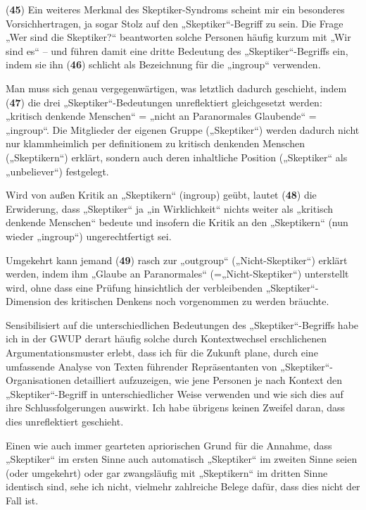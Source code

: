 (\textbf{45}) Ein weiteres Merkmal des Skeptiker-Syndroms scheint mir
ein besonderes Vorsichhertragen, ja sogar Stolz auf den
„Skeptiker``-Begriff zu sein. Die Frage „Wer sind die Skeptiker?``
beantworten solche Personen häufig kurzum mit „Wir sind es`` -- und
führen damit eine dritte Bedeutung des „Skeptiker``-Begriffs ein, indem
sie ihn (\textbf{46}) schlicht als Bezeichnung für die „ingroup``
verwenden.

Man muss sich genau vergegenwärtigen, was letztlich dadurch geschieht,
indem (\textbf{47}) die drei „Skeptiker``-Bedeutungen unreflektiert
gleichgesetzt werden: „kritisch denkende Menschen`` = „nicht an
Paranormales Glaubende`` = „ingroup``. Die Mitglieder der eigenen Gruppe
(„Skeptiker``) werden dadurch nicht nur klammheimlich per definitionem
zu kritisch denkenden Menschen („Skeptikern``) erklärt, sondern auch
deren inhaltliche Position („Skeptiker`` als „unbeliever``) festgelegt.

Wird von außen Kritik an „Skeptikern`` (ingroup) geübt, lautet
(\textbf{48}) die Erwiderung, dass „Skeptiker`` ja „in Wirklichkeit``
nichts weiter als „kritisch denkende Menschen`` bedeute und insofern die
Kritik an den „Skeptikern`` (nun wieder „ingroup``) ungerechtfertigt
sei.

Umgekehrt kann jemand (\textbf{49}) rasch zur „outgroup``
(„Nicht-Skeptiker``) erklärt werden, indem ihm „Glaube an Paranormales``
(=„Nicht-Skeptiker``) unterstellt wird, ohne dass eine Prüfung
hinsichtlich der verbleibenden „Skeptiker``-Dimension des kritischen
Denkens noch vorgenommen zu werden bräuchte.

Sensibilisiert auf die unterschiedlichen Bedeutungen des
„Skeptiker``-Begriffs habe ich in der GWUP derart häufig solche durch
Kontextwechsel erschlichenen Argumentationsmuster erlebt, dass ich für
die Zukunft plane, durch eine umfassende Analyse von Texten führender
Repräsentanten von „Skeptiker``-Organisationen detailliert aufzuzeigen,
wie jene Personen je nach Kontext den „Skeptiker``-Begriff in
unterschiedlicher Weise verwenden und wie sich dies auf ihre
Schlussfolgerungen auswirkt. Ich habe übrigens keinen Zweifel daran,
dass dies unreflektiert geschieht.

Einen wie auch immer gearteten apriorischen Grund für die Annahme, dass
„Skeptiker`` im ersten Sinne auch automatisch „Skeptiker`` im zweiten
Sinne seien (oder umgekehrt) oder gar zwangsläufig mit „Skeptikern`` im
dritten Sinne identisch sind, sehe ich nicht, vielmehr zahlreiche Belege
dafür, dass dies nicht der Fall ist.

